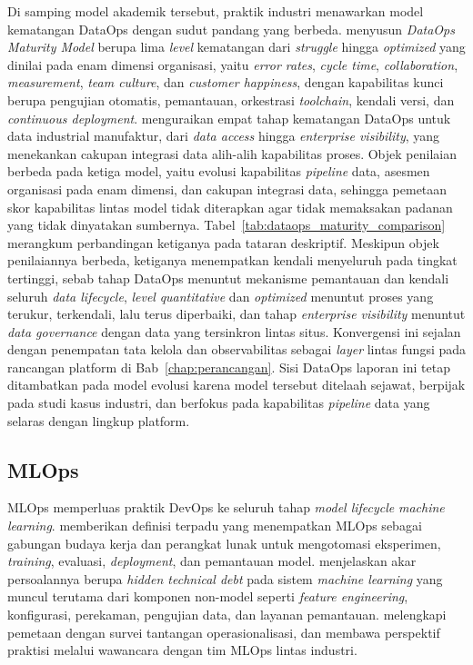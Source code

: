 Di samping model akademik tersebut, praktik industri menawarkan model kematangan DataOps dengan sudut pandang yang berbeda. \textcite{datakitchen2020maturity} menyusun \textit{DataOps Maturity Model} berupa lima \textit{level} kematangan dari \textit{struggle} hingga \textit{optimized} yang dinilai pada enam dimensi organisasi, yaitu \textit{error rates}, \textit{cycle time}, \textit{collaboration}, \textit{measurement}, \textit{team culture}, dan \textit{customer happiness}, dengan kapabilitas kunci berupa pengujian otomatis, pemantauan, orkestrasi \textit{toolchain}, kendali versi, dan \textit{continuous deployment}. \textcite{harrington2023highbyte} menguraikan empat tahap kematangan DataOps untuk data industrial manufaktur, dari \textit{data access} hingga \textit{enterprise visibility}, yang menekankan cakupan integrasi data alih-alih kapabilitas proses. Objek penilaian berbeda pada ketiga model, yaitu evolusi kapabilitas \textit{pipeline} data, asesmen organisasi pada enam dimensi, dan cakupan integrasi data, sehingga pemetaan skor kapabilitas lintas model tidak diterapkan agar tidak memaksakan padanan yang tidak dinyatakan sumbernya. Tabel~\ref{tab:dataops_maturity_comparison} merangkum perbandingan ketiganya pada tataran deskriptif. Meskipun objek penilaiannya berbeda, ketiganya menempatkan kendali menyeluruh pada tingkat tertinggi, sebab tahap DataOps menuntut mekanisme pemantauan dan kendali seluruh \textit{data lifecycle}, \textit{level} \textit{quantitative} dan \textit{optimized} menuntut proses yang terukur, terkendali, lalu terus diperbaiki, dan tahap \textit{enterprise visibility} menuntut \textit{data governance} dengan data yang tersinkron lintas situs. Konvergensi ini sejalan dengan penempatan tata kelola dan observabilitas sebagai \textit{layer} lintas fungsi pada rancangan platform di Bab~\ref{chap:perancangan}. Sisi DataOps laporan ini tetap ditambatkan pada model evolusi \textcite{munappy2020adhoc} karena model tersebut ditelaah sejawat, berpijak pada studi kasus industri, dan berfokus pada kapabilitas \textit{pipeline} data yang selaras dengan lingkup platform.



\subsection{MLOps}
\label{subsec:mlops}
\label{subsec:maturity}

MLOps memperluas praktik DevOps ke seluruh tahap \textit{model lifecycle} \textit{machine learning}. \textcite{kreuzberger2023mlops} memberikan definisi terpadu yang menempatkan MLOps sebagai gabungan budaya kerja dan perangkat lunak untuk mengotomasi eksperimen, \textit{training}, evaluasi, \textit{deployment}, dan pemantauan model. \textcite{sculley2015hidden} menjelaskan akar persoalannya berupa \textit{hidden technical debt} pada sistem \textit{machine learning} yang muncul terutama dari komponen non-model seperti \textit{feature engineering}, konfigurasi, perekaman, pengujian data, dan layanan pemantauan. \textcite{paleyes2022challenges} melengkapi pemetaan dengan survei tantangan operasionalisasi, dan \textcite{shankar2022operationalizing} membawa perspektif praktisi melalui wawancara dengan tim MLOps lintas industri.

